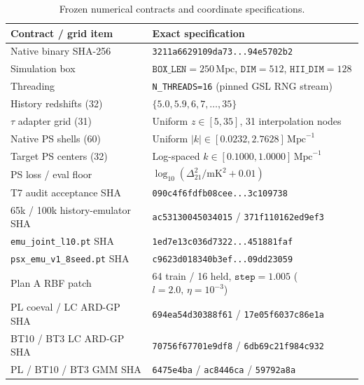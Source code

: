 \documentclass[aps,prd,reprint,superscriptaddress,nofootinbib,amsmath,amssymb,floatfix,longbibliography]{revtex4-2}
\begin{document}
\begin{table}[!tbp]
\caption{Frozen numerical contracts and coordinate specifications.}
\label{tab:provenance}
\footnotesize
\setlength{\tabcolsep}{3.5pt}
\begin{ruledtabular}
\begin{tabular}{p{3.05cm}p{4.83cm}}
Contract / grid item & Exact specification \\
\hline
Native binary SHA-256 & \texttt{3211a6629109da73...94e5702b2} \\
Simulation box & $\texttt{BOX\_LEN}=250\,\mathrm{Mpc}$, $\texttt{DIM}=512$, $\texttt{HII\_DIM}=128$ \\
Threading & \texttt{N\_THREADS=16} (pinned GSL RNG stream) \\
History redshifts (32) & $\{5.0, 5.9, 6, 7, \dots, 35\}$ \\
$\tau$ adapter grid (31) & Uniform $z \in [5, 35]$, 31 interpolation nodes \\
Native PS shells (60) & Uniform $|k| \in [0.0232, 2.7628]\,\mathrm{Mpc}^{-1}$ \\
Target PS centers (32) & Log-spaced $k \in [0.1000, 1.0000]\,\mathrm{Mpc}^{-1}$ \\
PS loss / eval floor & $\log_{10}(\Delta^2_{21}/\mathrm{mK}^2 + 0.01)$ \\
T7 audit acceptance SHA & \texttt{090c4f6fdfb08cee...3c109738} \\
65k / 100k history-emulator SHA & \texttt{ac53130045034015} / \texttt{371f110162ed9ef3} \\
\texttt{emu\_joint\_l10.pt} SHA & \texttt{1ed7e13c036d7322...451881faf} \\
\texttt{psx\_emu\_v1\_8seed.pt} SHA & \texttt{c9623d018340b3ef...09dd23059} \\
Plan A RBF patch & 64 train / 16 held, $\texttt{step}=1.005$ ($l=2.0,\,\eta=10^{-3}$) \\
PL coeval / LC ARD-GP SHA & \texttt{694ea54d30388f61} / \texttt{17e05f6037c86e1a} \\
BT10 / BT3 LC ARD-GP SHA & \texttt{70756f67701e9df8} / \texttt{6db69c21f984c932} \\
PL / BT10 / BT3 GMM SHA & \texttt{6475e4ba} / \texttt{ac8446ca} / \texttt{59792a8a} \\
\end{tabular}
\end{ruledtabular}
\end{table}


\end{document}
